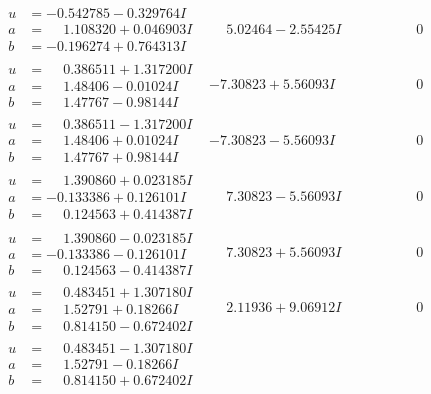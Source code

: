 \documentclass[1p]{elsarticle_modified}
\theoremstyle{definition}
\begin{document}
$$\begin{array}{c|c|c}
\begin{aligned}
u &= -0.542785 - 0.329764 I \\
a &= \phantom{-}1.108320 + 0.046903 I \\
b &= -0.196274 + 0.764313 I\end{aligned}
 & \phantom{-}5.02464 - 2.55425 I & \phantom{-0.000000 } 0 \\ \hline\begin{aligned}
u &= \phantom{-}0.386511 + 1.317200 I \\
a &= \phantom{-}1.48406 - 0.01024 I \\
b &= \phantom{-}1.47767 - 0.98144 I\end{aligned}
 & -7.30823 + 5.56093 I & \phantom{-0.000000 } 0 \\ \hline\begin{aligned}
u &= \phantom{-}0.386511 - 1.317200 I \\
a &= \phantom{-}1.48406 + 0.01024 I \\
b &= \phantom{-}1.47767 + 0.98144 I\end{aligned}
 & -7.30823 - 5.56093 I & \phantom{-0.000000 } 0 \\ \hline\begin{aligned}
u &= \phantom{-}1.390860 + 0.023185 I \\
a &= -0.133386 + 0.126101 I \\
b &= \phantom{-}0.124563 + 0.414387 I\end{aligned}
 & \phantom{-}7.30823 - 5.56093 I & \phantom{-0.000000 } 0 \\ \hline\begin{aligned}
u &= \phantom{-}1.390860 - 0.023185 I \\
a &= -0.133386 - 0.126101 I \\
b &= \phantom{-}0.124563 - 0.414387 I\end{aligned}
 & \phantom{-}7.30823 + 5.56093 I & \phantom{-0.000000 } 0 \\ \hline\begin{aligned}
u &= \phantom{-}0.483451 + 1.307180 I \\
a &= \phantom{-}1.52791 + 0.18266 I \\
b &= \phantom{-}0.814150 - 0.672402 I\end{aligned}
 & \phantom{-}2.11936 + 9.06912 I & \phantom{-0.000000 } 0 \\ \hline\begin{aligned}
u &= \phantom{-}0.483451 - 1.307180 I \\
a &= \phantom{-}1.52791 - 0.18266 I \\
b &= \phantom{-}0.814150 + 0.672402 I\end{aligned}

\end{array}$$
\end{document}
